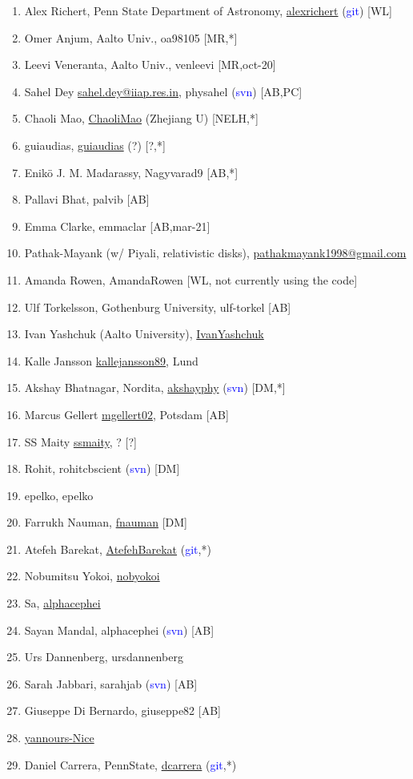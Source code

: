\documentclass{article}
\def\blue{\textcolor{blue}}
\begin{document}
\begin{enumerate}
\item Alex Richert, Penn State Department of Astronomy, \url{alexrichert} (\blue{git}) [WL]
\item Omer Anjum, Aalto Univ., oa98105 [MR,*] %
\item Leevi Veneranta, Aalto Univ., venleevi [MR,oct-20]
\item Sahel Dey \url{sahel.dey@iiap.res.in}, physahel (\blue{svn}) [AB,PC]
\item Chaoli Mao, \url{ChaoliMao} (Zhejiang U) [NELH,*] %
\item guiaudias, \url{guiaudias} (?) [?,*] %
\item Enik\"o J. M. Madarassy, Nagyvarad9 [AB,*]
\item Pallavi Bhat, palvib [AB]
\item Emma Clarke, emmaclar [AB,mar-21]
\item Pathak-Mayank (w/ Piyali, relativistic disks), \url{pathakmayank1998@gmail.com}
\item Amanda Rowen, AmandaRowen [WL, not currently using the code]
\item Ulf Torkelsson, Gothenburg University, ulf-torkel [AB]
\item Ivan Yashchuk (Aalto University), \url{IvanYashchuk}
\item Kalle Jansson \url{kallejansson89}, Lund
\item Akshay Bhatnagar, Nordita, \url{akshayphy} (\blue{svn}) [DM,*]
\item Marcus Gellert \url{mgellert02}, Potsdam [AB]
\item SS Maity \url{ssmaity}, ? [?]
\item Rohit, rohitcbscient (\blue{svn}) [DM] %
\item epelko, epelko
\item Farrukh Nauman, \url{fnauman} [DM]
\item Atefeh Barekat, \url{AtefehBarekat} (\blue{git},*)
\item Nobumitsu Yokoi, \url{nobyokoi}
\item Sa, \url{alphacephei}
\item Sayan Mandal, alphacephei (\blue{svn}) [AB]
\item Urs Dannenberg, ursdannenberg \url{}
\item Sarah Jabbari, sarahjab (\blue{svn}) [AB]
\item Giuseppe Di Bernardo, giuseppe82 [AB]
\item \url{yannours-Nice} %
\item Daniel Carrera, PennState, \url{dcarrera} (\blue{git},*)

\end{enumerate}
\end{document}
